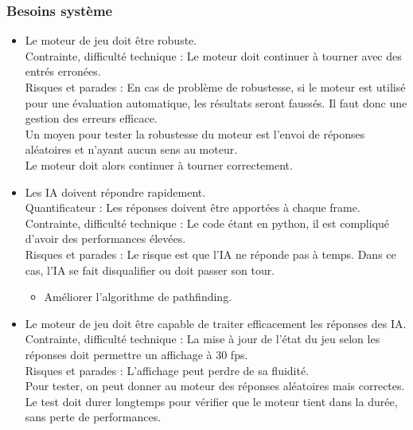 \documentclass[french]{article}
\begin{document}
\subsubsection{Besoins système}
    \begin{itemize}
        \item Le moteur de jeu doit être robuste. \\
            Contrainte, difficulté technique : Le moteur doit continuer à tourner avec des entrés erronées. \\
            Risques et parades : En cas de problème de robustesse, si le moteur est utilisé pour une évaluation automatique, les résultats seront faussés. Il faut donc une gestion des erreurs efficace.\\
            Un moyen pour tester la robustesse du moteur est l'envoi de réponses aléatoires et n'ayant aucun sens au moteur.\\
            Le moteur doit alors continuer à tourner correctement.\\

        \item Les IA doivent répondre rapidement.\\
            Quantificateur : Les réponses doivent être apportées à chaque frame.\\
            Contrainte, difficulté technique : Le code étant en python, il est compliqué d'avoir des performances élevées.\\
            Risques et parades : Le risque est que l'IA ne réponde pas à temps. Dans ce cas, l'IA se fait disqualifier ou doit passer son tour.\\
            \begin{itemize}
                \item Améliorer l'algorithme de pathfinding.
            \end{itemize}
        
        \item Le moteur de jeu doit être capable de traiter efficacement les réponses des IA.\\
            Contrainte, difficulté technique :  La mise à jour de l'état du jeu selon les réponses doit permettre un affichage à 30 fps.\\
            Risques et parades : L'affichage peut perdre de sa fluidité.\\
            Pour tester, on peut donner au moteur des réponses aléatoires mais correctes. Le test doit durer longtemps pour vérifier que le moteur tient dans la durée, sans perte de performances.\\
        
    \end{itemize}
\end{document}
